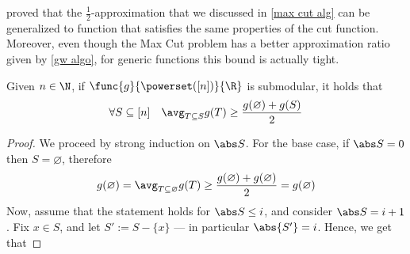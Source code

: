 \documentclass[a4paper, 12pt]{report}
\begin{document}
    \textcite{fmv} proved that the $\tfrac{1}{2}$-approximation that we discussed in \cref{max cut alg} can be generalized to  function that satisfies the same properties of the cut function. Moreover, even though the Max Cut problem has a better approximation ratio given by \cref{gw algo}, for generic functions this bound is actually tight.

    \begin{framedlem}{}
        Given $n \in \N$, if $\func{g}{\powerset([n])}{\R}$ is submodular, it holds that $$\forall S \subseteq [n] \quad \avg_{T \subseteq S}{g(T)} \ge \dfrac{g(\varnothing) + g(S)}{2}$$
    \end{framedlem}

    \begin{proof}
        We proceed by strong induction on $\abs S$. For the base case, if $\abs S = 0$ then $S = \varnothing$, therefore $$g(\varnothing) = \avg_{T \subseteq \varnothing}{g(T)} \ge \dfrac{g(\varnothing) + g(\varnothing)}{2} = g(\varnothing)$$ Now, assume that the statement holds for $\abs S \le i$, and consider $\abs S = i + 1$. Fix $x \in S$, and let $S' := S - \{x\}$ --- in particular $\abs{S'} = i$. Hence, we get that


\end{proof}
\end{document}
